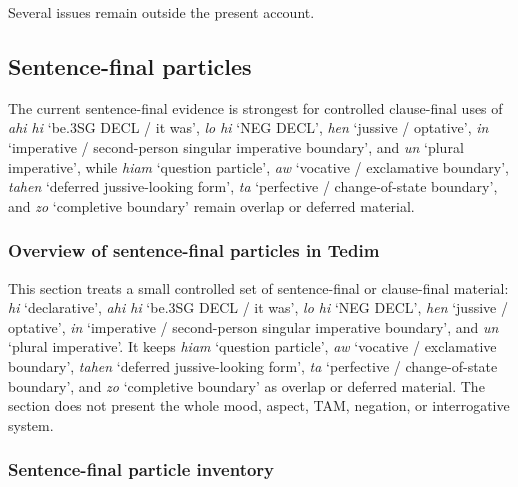\documentclass[
  11pt,
  a4paper,
]{article}
\newcommand{\tdim}[1]{\textit{#1}}
\newcommand{\glossquote}[1]{`#1'}
\begin{document}
Several issues remain outside the present account.

\subsection{Sentence-final particles}\label{sentence-final-particles}

The current sentence-final evidence is strongest for controlled
clause-final uses of \tdim{ahi hi} \glossquote{be.3SG DECL / it was},
\tdim{lo hi} \glossquote{NEG DECL}, \tdim{hen}
\glossquote{jussive / optative}, \tdim{in}
\glossquote{imperative / second-person singular imperative boundary},
and \tdim{un} \glossquote{plural imperative}, while \tdim{hiam}
\glossquote{question particle}, \tdim{aw}
\glossquote{vocative / exclamative boundary}, \tdim{tahen}
\glossquote{deferred jussive-looking form}, \tdim{ta}
\glossquote{perfective / change-of-state boundary}, and \tdim{zo}
\glossquote{completive boundary} remain overlap or deferred material.

\subsubsection{Overview of sentence-final particles in
Tedim}\label{overview-of-sentence-final-particles-in-tedim}

This section treats a small controlled set of sentence-final or
clause-final material: \tdim{hi} \glossquote{declarative}, \tdim{ahi hi}
\glossquote{be.3SG DECL / it was}, \tdim{lo hi} \glossquote{NEG DECL},
\tdim{hen} \glossquote{jussive / optative}, \tdim{in}
\glossquote{imperative / second-person singular imperative boundary},
and \tdim{un} \glossquote{plural imperative}. It keeps \tdim{hiam}
\glossquote{question particle}, \tdim{aw}
\glossquote{vocative / exclamative boundary}, \tdim{tahen}
\glossquote{deferred jussive-looking form}, \tdim{ta}
\glossquote{perfective / change-of-state boundary}, and \tdim{zo}
\glossquote{completive boundary} as overlap or deferred material. The
section does not present the whole mood, aspect, TAM, negation, or
interrogative system.

\subsubsection{Sentence-final particle
inventory}\label{sentence-final-particle-inventory}
\end{document}
